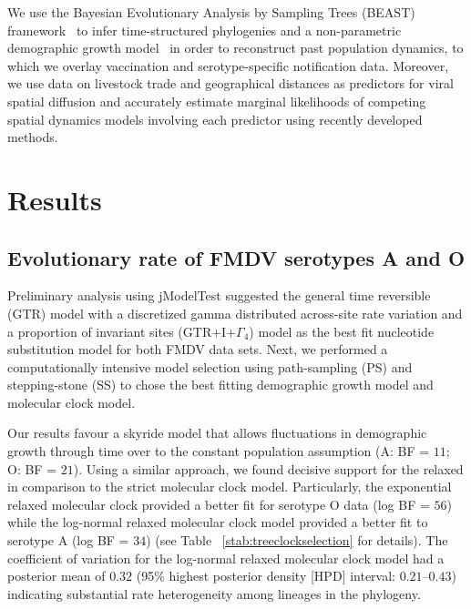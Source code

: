 \documentclass[10pt]{article}
\begin{document}
We use the Bayesian Evolutionary Analysis by Sampling Trees (BEAST) framework~\cite{beast2012} to infer time-structured phylogenies and a non-parametric demographic growth model~\cite{skyride} in order to reconstruct past population dynamics, to which we overlay vaccination and serotype-specific notification data.
Moreover, we use data on livestock trade and geographical distances as predictors for viral spatial diffusion and accurately estimate marginal likelihoods of competing spatial dynamics models involving each predictor using recently developed methods.

\section*{Results}

\subsection*{Evolutionary rate of FMDV serotypes A and O}

Preliminary analysis using jModelTest suggested the general time reversible (GTR) model with a discretized gamma distributed across-site rate variation and a proportion of invariant sites (GTR+I+$\Gamma_{4}$) model as the best fit nucleotide substitution model for both FMDV data sets.
Next, we performed a computationally intensive model selection using path-sampling (PS) and stepping-stone (SS) to chose the best fitting demographic growth model and molecular clock model.

Our results favour a skyride model that allows fluctuations in demographic growth through time  over to the constant population assumption (A: BF = $11$; O: BF = $21$).
Using a similar approach, we  found decisive support for the relaxed in comparison to the strict molecular clock model.
Particularly, the exponential relaxed molecular clock provided a better fit for serotype O data (log BF = $56$) while the log-normal relaxed molecular clock model provided a better fit to serotype A (log BF = $34$) (see Table ~\ref{stab:treeclockselection} for details). 
The coefficient of variation for the log-normal relaxed molecular clock model had a posterior mean of $0.32$ (95\% highest posterior density [HPD] interval: $0.21$--$0.43$) indicating substantial rate heterogeneity among lineages in the phylogeny.
\end{document}
